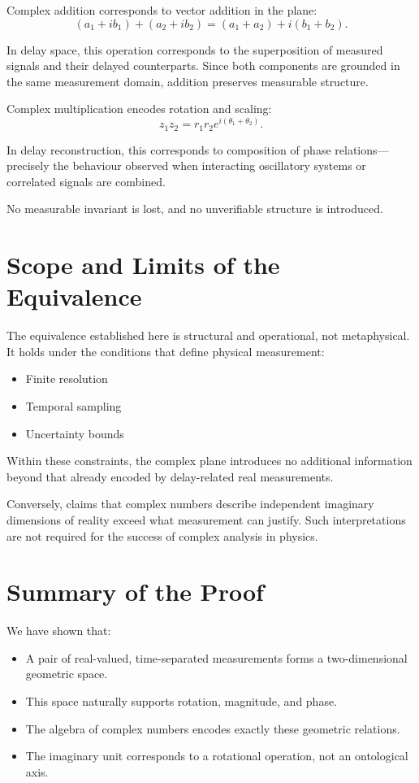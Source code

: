 \documentclass[12pt]{book}  %
\begin{document}
Complex addition corresponds to vector addition in the plane:
\[
(a_1 + i b_1) + (a_2 + i b_2) = (a_1 + a_2) + i (b_1 + b_2).
\]

In delay space, this operation corresponds to the superposition of measured signals and their delayed counterparts. Since both components are grounded in the same measurement domain, addition preserves measurable structure.

Complex multiplication encodes rotation and scaling:
\[
z_1 z_2 = r_1 r_2 e^{i (\theta_1 + \theta_2)}.
\]

In delay reconstruction, this corresponds to composition of phase relations—precisely the behaviour observed when interacting oscillatory systems or correlated signals are combined.

No measurable invariant is lost, and no unverifiable structure is introduced.

\section*{Scope and Limits of the Equivalence}

The equivalence established here is structural and operational, not metaphysical. It holds under the conditions that define physical measurement:

\begin{itemize}
    \item Finite resolution
    \item Temporal sampling
    \item Uncertainty bounds
\end{itemize}

Within these constraints, the complex plane introduces no additional information beyond that already encoded by delay-related real measurements.

Conversely, claims that complex numbers describe independent imaginary dimensions of reality exceed what measurement can justify. Such interpretations are not required for the success of complex analysis in physics.

\section*{Summary of the Proof}

We have shown that:

\begin{itemize}
    \item A pair of real-valued, time-separated measurements forms a two-dimensional geometric space.
    \item This space naturally supports rotation, magnitude, and phase.
    \item The algebra of complex numbers encodes exactly these geometric relations.
    \item The imaginary unit corresponds to a rotational operation, not an ontological axis.
\end{itemize}
\end{document}

